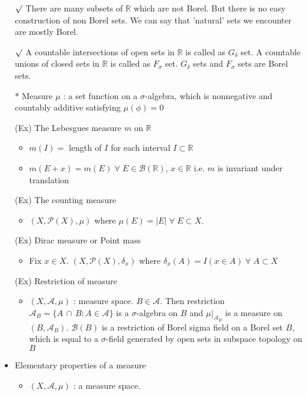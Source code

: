 \documentclass[12pt]{article}
\newcommand{\rmk}{$\surd$}
\newcommand{\R}{\mathbb{R}}
\newcommand{\A}{\mathcal{A}}
\newcommand{\Borel}{\mathcal{B}(\mathbb{R})}
\newcommand{\forany}{\; \forall \;}
\newcommand{\intersect}{\,\cap\,}
\begin{document}
\begin{itemize}
\begin{enumerate}
    \end{enumerate}
    \item[\rmk] There are many subsets of $\R$ which are not Borel. But there is no easy construction of non Borel sets. We can say that 'natural' sets we encounter are mostly Borel. 
    \item[\rmk] A countable intersections of open sets in $\R$ is called as $G_\delta$ set. A countable unions of closed sets in $\R$ is called as $F_\sigma$ set. $G_\delta$ sets and $F_\sigma$ sets are Borel sets.
    \item[*] Measure $\mu$ : a set function on a $\sigma$-algebra, which is nonnegative and countably additive satisfying $\mu(\phi)=0$
    \item[(Ex)] The Lebesgues measure $m$ on $\R$
    \begin{itemize}
        \item $m(I)=$ length of $I$ for each interval $I\subset \R$
        \item $m(E+x)=m(E) \forany E\in \Borel,\, x\in \R$ \; i.e. $m$ is invariant under translation
    \end{itemize}
    \item[(Ex)] The counting measure
    \begin{itemize}
        \item $(X, \mathcal{P}(X), \mu)$ where $\mu(E)=|E| \forany E\subset X$.
    \end{itemize}
    \item[(Ex)] Dirac measure or Point mass
    \begin{itemize}
        \item Fix $x\in X$. $(X, \mathcal{P}(X), \delta_x)$ where $\delta_x(A)=I(x\in A) \forany A\subset X$
    \end{itemize} 
    \item[(Ex)] Restriction of measure
    \begin{itemize}
        \item $(X, \A, \mu)$ : measure space. $B\in \A$. Then restriction $\A_B=\{A\intersect B : A\in \A\}$ is a $\sigma$-algebra on $B$ and $\mu |_{\A_B}$ is a measure on $(B, \A_B)$. $\mathcal{B}(B)$ is a restriction of Borel sigma field on a Borel set $B$, which is equal to a $\sigma$-field generated by open sets in subspace topology on $B$ 
    \end{itemize}
    \bigskip
    \item Elementary properties of a measure
    \begin{itemize}
        \item $(X, \A, \mu)$ : a measure space.

\end{itemize}
\end{itemize}
\end{document}

